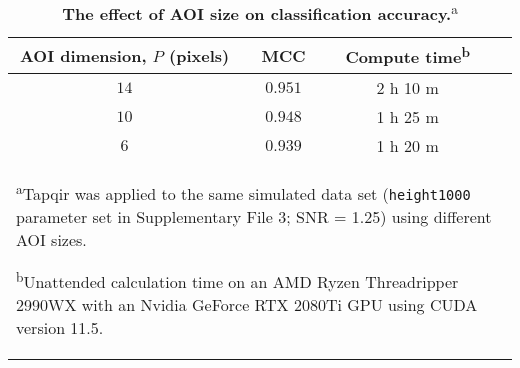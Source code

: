 \begin{table}[]
\caption{\label{tab:aoisize} \textbf{The effect of AOI size on classification accuracy.}\textsuperscript{a}}
\begin{tabular}{cccc}
    \toprule
    AOI dimension, $P$ (pixels) & MCC & Compute time\textsuperscript{b} \\
    \midrule
    $14$ & $0.951$ & 2 h 10 m \\
    $10$ & $0.948$ & 1 h 25 m \\
    $6$ & $0.939$ & 1 h 20 m \\
    \bottomrule
    \multicolumn{4}{l}{\footnotesize{\parbox{0.6\textwidth}{\rule{0pt}{3ex}\textsuperscript{a}Tapqir was applied to the same simulated data set (\texttt{height1000} parameter set in Supplementary File 3; SNR = 1.25) using different AOI sizes.
    
    \textsuperscript{b}Unattended calculation time on an AMD Ryzen Threadripper 2990WX with an Nvidia GeForce RTX 2080Ti GPU using CUDA version 11.5.}}} \rule{0pt}{3ex} \\
    \bottomrule
\end{tabular}
\end{table}